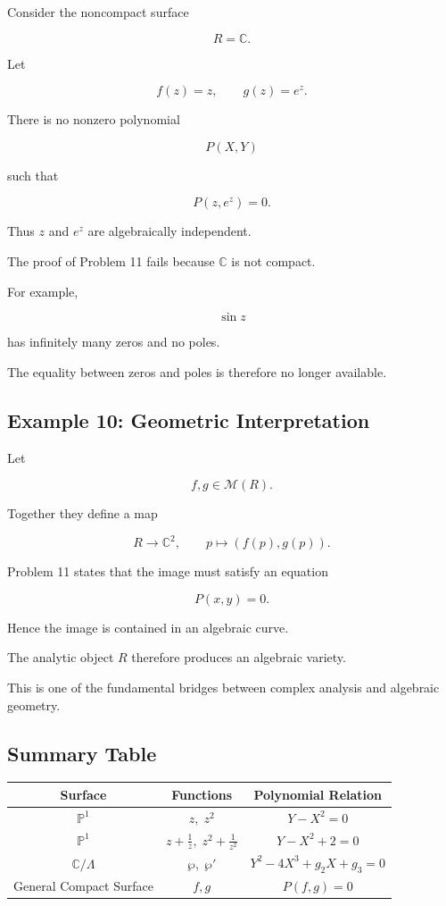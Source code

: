 \documentclass[12pt,a4paper]{article}
\theoremstyle{notespace}
\begin{document}
Consider the noncompact surface

\[
R=\mathbb C.
\]

Let

\[
f(z)=z,
\qquad
g(z)=e^z.
\]

There is no nonzero polynomial

\[
P(X,Y)
\]

such that

\[
P(z,e^z)=0.
\]

Thus \(z\) and \(e^z\) are algebraically independent.

The proof of Problem 11 fails because \(\mathbb C\) is not compact.

For example,

\[
\sin z
\]

has infinitely many zeros and no poles.

The equality between zeros and poles is therefore no longer available.

\subsection{Example 10: Geometric Interpretation}

Let

\[
f,g\in\mathcal M(R).
\]

Together they define a map

\[
R
\longrightarrow
\mathbb C^2,
\qquad
p
\longmapsto
(f(p),g(p)).
\]

Problem 11 states that the image must satisfy an equation

\[
P(x,y)=0.
\]

Hence the image is contained in an algebraic curve.

The analytic object \(R\) therefore produces an algebraic variety.

This is one of the fundamental bridges between complex analysis and algebraic geometry.

\subsection{Summary Table}

\begin{center}
	\renewcommand{\arraystretch}{1.4}
	\begin{tabular}{|c|c|c|}
		\hline
		Surface & Functions & Polynomial Relation \\
		\hline
		\(\mathbb P^1\)
		&
		\(z,\;z^2\)
		&
		\(Y-X^2=0\)
		\\
		\hline
		\(\mathbb P^1\)
		&
		\(z+\frac1z,\;
		z^2+\frac1{z^2}\)
		&
		\(Y-X^2+2=0\)
		\\
		\hline
		\(\mathbb C/\Lambda\)
		&
		\(\wp,\;\wp'\)
		&
		\(Y^2-4X^3+g_2X+g_3=0\)
		\\
		\hline
		General Compact Surface
		&
		\(f,g\)
		&
		\(P(f,g)=0\)
		\\
		\hline
	\end{tabular}
\end{center}
	
\end{document}
